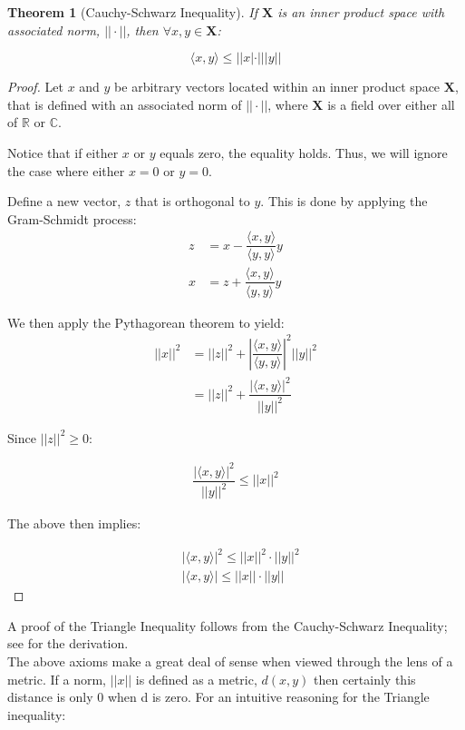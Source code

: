\documentclass[12pt,a4paper]{report}
\theoremstyle{thms}
\newtheorem{theorem}{Theorem}[section]
\theoremstyle{defns}
\begin{document}
\begin{theorem}[Cauchy-Schwarz Inequality]
    If $\mathbf{X}$ is an inner product space with associated norm, $||\cdot||$, then $\forall x, y \in  \mathbf{X}$:

    \begin{equation}
        \langle x, y \rangle \leq ||x|\cdot|||y||
    \end{equation}
\end{theorem}

\begin{proof}
    Let $x$ and $y$ be arbitrary vectors located within an inner product space $\mathbf{X}$, that is defined with an associated norm of $||\cdot||$, where $\mathbf{X}$ is a field over either all of $\mathbb{R}$ or $\mathbb{C}$.

    Notice that if either $x$ or $y$ equals zero, the equality holds. Thus, we will ignore the case where either $x = 0$ or $y = 0$.

    Define a new vector, $z$ that is orthogonal to $y$. This is done by applying the Gram-Schmidt process:
    \begin{align}
        z & = x  - \dfrac{\langle x, y \rangle}{\langle y, y \rangle}y \\
        x & = z + \dfrac{\langle x, y \rangle}{\langle y, y \rangle}y
    \end{align}

    We then apply the Pythagorean theorem to yield:
    \begin{align}
        ||x||^2 & = ||z||^2 + \left|\dfrac{\langle x, y \rangle}{\langle y, y \rangle}\right|^2||y||^2 \\
                & = ||z||^2 + \dfrac{|\langle x, y \rangle|^2}{||y||^2}
    \end{align}

    Since $||z||^2 \geq 0$:

    \begin{align}
        \dfrac{|\langle x, y \rangle|^2}{||y||^2} \leq ||x||^2
    \end{align}

    The above then implies:

    \begin{align}
         & |\langle x, y \rangle|^2 \leq ||x||^2\cdot||y||^2 \\
         & |\langle x, y \rangle| \leq ||x||\cdot||y||
    \end{align}
\end{proof}

A proof of the Triangle Inequality follows from the Cauchy-Schwarz Inequality; see \cite{holland_schwarz} for the derivation.\\
The above axioms make a great deal of sense when viewed through the lens of a metric. If a norm, $||x||$ is defined as a metric, $d(x, y)$ then certainly this distance is only 0 when d is zero. For an intuitive reasoning for the Triangle inequality:
\end{document}
